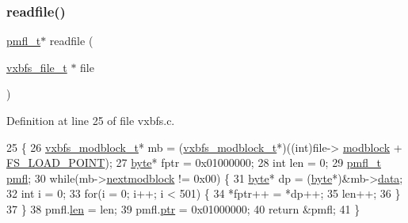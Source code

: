 \subsubsection{\texorpdfstring{readfile()}{readfile()}}
{\footnotesize\ttfamily \hyperlink{a00191_a02f7eedc7de6c770b6b29a62905fc61d_a02f7eedc7de6c770b6b29a62905fc61d}{pmfl\+\_\+t}$\ast$ readfile (\begin{DoxyParamCaption}\item[{\hyperlink{a00206_abb93e2407af0d8fe0f5629ce6456c6f9_abb93e2407af0d8fe0f5629ce6456c6f9}{vxbfs\+\_\+file\+\_\+t} $\ast$}]{file }\end{DoxyParamCaption})}



Definition at line 25 of file vxbfs.\+c.


\begin{DoxyCode}
25                                      \{
26     \hyperlink{a00332}{vxbfs\_modblock\_t}* mb = (\hyperlink{a00332}{vxbfs\_modblock\_t}*)((\textcolor{keywordtype}{int})file->
      \hyperlink{a00336_a56503c715b4121591ca7367c9cbd7093_a56503c715b4121591ca7367c9cbd7093}{modblock} + \hyperlink{a00134_ade5f4f9306a7cacc0cb2a518bd97e237_ade5f4f9306a7cacc0cb2a518bd97e237}{FS\_LOAD\_POINT});
27     \hyperlink{a00140_ab8ef12fab634c171394422d0ee8baf94_ab8ef12fab634c171394422d0ee8baf94}{byte}* fptr = 0x01000000;
28     \textcolor{keywordtype}{int} len = 0;
29     \hyperlink{a00320}{pmfl\_t} \hyperlink{a00320}{pmfl};
30     \textcolor{keywordflow}{while}(mb->\hyperlink{a00332_afbf261c73a36b4d33e8a8b5179d4385b_afbf261c73a36b4d33e8a8b5179d4385b}{nextmodblock} != 0x00) \{
31         \hyperlink{a00140_ab8ef12fab634c171394422d0ee8baf94_ab8ef12fab634c171394422d0ee8baf94}{byte}* dp = (\hyperlink{a00140_ab8ef12fab634c171394422d0ee8baf94_ab8ef12fab634c171394422d0ee8baf94}{byte}*)&mb->\hyperlink{a00332_a327348a3ea3a02cfde4cdb1ccdcf2073_a327348a3ea3a02cfde4cdb1ccdcf2073}{data};
32         \textcolor{keywordtype}{int} i = 0;
33         \textcolor{keywordflow}{for}(i = 0; i++; i < 501) \{
34             *fptr++ = *dp++;
35             len++;
36         \}
37     \}
38     pmfl.\hyperlink{a00320_ae4da44b065ddc955692df6fddd24a9c4_ae4da44b065ddc955692df6fddd24a9c4}{len} = len;
39     pmfl.\hyperlink{a00320_a150c011a31f99dbd408f8650f3fa1089_a150c011a31f99dbd408f8650f3fa1089}{ptr} = 0x01000000;
40     \textcolor{keywordflow}{return} &pmfl;
41 \}
\end{DoxyCode}
\mbox{\label{a00206_a4d38ed022dd74a1ef381240419f8fd72_a4d38ed022dd74a1ef381240419f8fd72}} 
